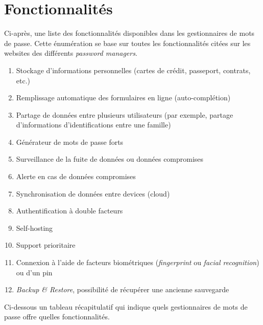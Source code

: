 \section{Fonctionnalités}
Ci-après, une liste des fonctionnalités disponibles dans les gestionnaires de mots de passe. Cette énumération se base sur toutes les fonctionnalités citées sur les websites des différents \textit{password managers}. \\
\begin{enumerate}
\item Stockage d'informations personnelles (cartes de crédit, passeport, contrats, etc.)
\item Remplissage automatique des formulaires en ligne (auto-complétion)
\item Partage de données entre plusieurs utilisateurs (par exemple, partage d'informations d'identifications entre une famille)
\item Générateur de mots de passe forts
\item Surveillance de la fuite de données ou données compromises
\item Alerte en cas de données compromises
\item Synchronisation de données entre devices (cloud)
\item Authentification à double facteurs
\item Self-hosting
\item Support prioritaire
\item Connexion à l'aide de facteurs biométriques (\textit{fingerprint} ou \textit{facial recognition}) ou d'un pin
\item \textit{Backup \& Restore}, possibilité de récupérer une ancienne sauvegarde

\end{enumerate}
Ci-dessous un tableau récapitulatif qui indique quels gestionnaires de mots de passe offre quelles fonctionnalités. 
